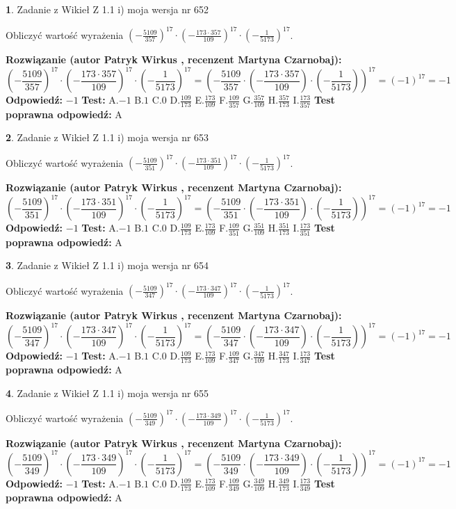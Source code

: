 \documentclass[12pt, a4paper]{article}
\theoremstyle{definition} %
\newtheorem{zad}{}
\newcommand{\zadStart}[1]{\begin{zad}#1\newline}
\newcommand{\zadStop}{\end{zad}}
\newcommand{\rozwStart}[2]{\noindent \textbf{Rozwiązanie (autor #1 , recenzent #2): }\newline}
\newcommand{\rozwStop}{\newline}
\newcommand{\odpStart}{\noindent \textbf{Odpowiedź:}\newline}
\newcommand{\odpStop}{\newline}
\newcommand{\testStart}{\noindent \textbf{Test:}\newline}
\newcommand{\testStop}{\newline}
\newcommand{\kluczStart}{\noindent \textbf{Test poprawna odpowiedź:}\newline}
\newcommand{\kluczStop}{\newline}
\begin{document}
\zadStart{Zadanie z Wikieł Z 1.1 i) moja wersja nr 652}

Obliczyć wartość wyrażenia $(-\frac{5109}{357})^{17} \cdot (-\frac{173 \cdot 357}{109})^{17} \cdot (-\frac{1}{5173})^{17}$.
\zadStop
\rozwStart{Patryk Wirkus}{Martyna Czarnobaj}
$$(-\frac{5109}{357})^{17} \cdot (-\frac{173 \cdot 357}{109})^{17} \cdot (-\frac{1}{5173})^{17} = (-\frac{5109}{357} \cdot (-\frac{173 \cdot 357}{109}) \cdot (-\frac{1}{5173}))^{17} = (-1)^{17} = -1$$
\rozwStop
\odpStart
$-1$
\odpStop
\testStart
A.$-1$ B.$1$ C.$0$ D.$\frac{109}{173}$ E.$\frac{173}{109}$
F.$\frac{109}{357}$ G.$\frac{357}{109}$
H.$\frac{357}{173}$
I.$\frac{173}{357}$
\testStop
\kluczStart
A
\kluczStop



\zadStart{Zadanie z Wikieł Z 1.1 i) moja wersja nr 653}

Obliczyć wartość wyrażenia $(-\frac{5109}{351})^{17} \cdot (-\frac{173 \cdot 351}{109})^{17} \cdot (-\frac{1}{5173})^{17}$.
\zadStop
\rozwStart{Patryk Wirkus}{Martyna Czarnobaj}
$$(-\frac{5109}{351})^{17} \cdot (-\frac{173 \cdot 351}{109})^{17} \cdot (-\frac{1}{5173})^{17} = (-\frac{5109}{351} \cdot (-\frac{173 \cdot 351}{109}) \cdot (-\frac{1}{5173}))^{17} = (-1)^{17} = -1$$
\rozwStop
\odpStart
$-1$
\odpStop
\testStart
A.$-1$ B.$1$ C.$0$ D.$\frac{109}{173}$ E.$\frac{173}{109}$
F.$\frac{109}{351}$ G.$\frac{351}{109}$
H.$\frac{351}{173}$
I.$\frac{173}{351}$
\testStop
\kluczStart
A
\kluczStop



\zadStart{Zadanie z Wikieł Z 1.1 i) moja wersja nr 654}

Obliczyć wartość wyrażenia $(-\frac{5109}{347})^{17} \cdot (-\frac{173 \cdot 347}{109})^{17} \cdot (-\frac{1}{5173})^{17}$.
\zadStop
\rozwStart{Patryk Wirkus}{Martyna Czarnobaj}
$$(-\frac{5109}{347})^{17} \cdot (-\frac{173 \cdot 347}{109})^{17} \cdot (-\frac{1}{5173})^{17} = (-\frac{5109}{347} \cdot (-\frac{173 \cdot 347}{109}) \cdot (-\frac{1}{5173}))^{17} = (-1)^{17} = -1$$
\rozwStop
\odpStart
$-1$
\odpStop
\testStart
A.$-1$ B.$1$ C.$0$ D.$\frac{109}{173}$ E.$\frac{173}{109}$
F.$\frac{109}{347}$ G.$\frac{347}{109}$
H.$\frac{347}{173}$
I.$\frac{173}{347}$
\testStop
\kluczStart
A
\kluczStop



\zadStart{Zadanie z Wikieł Z 1.1 i) moja wersja nr 655}

Obliczyć wartość wyrażenia $(-\frac{5109}{349})^{17} \cdot (-\frac{173 \cdot 349}{109})^{17} \cdot (-\frac{1}{5173})^{17}$.
\zadStop
\rozwStart{Patryk Wirkus}{Martyna Czarnobaj}
$$(-\frac{5109}{349})^{17} \cdot (-\frac{173 \cdot 349}{109})^{17} \cdot (-\frac{1}{5173})^{17} = (-\frac{5109}{349} \cdot (-\frac{173 \cdot 349}{109}) \cdot (-\frac{1}{5173}))^{17} = (-1)^{17} = -1$$
\rozwStop
\odpStart
$-1$
\odpStop
\testStart
A.$-1$ B.$1$ C.$0$ D.$\frac{109}{173}$ E.$\frac{173}{109}$
F.$\frac{109}{349}$ G.$\frac{349}{109}$
H.$\frac{349}{173}$
I.$\frac{173}{349}$
\testStop
\kluczStart
A
\kluczStop
\end{document}
